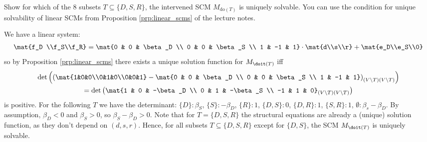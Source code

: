 \begin{enumerate}
	Show for which of the 8 subsets $T \subseteq \{D, S, R\}$, the intervened SCM $M_{\text{do}(T)}$ is uniquely solvable. You can use the condition for unique solvability of linear SCMs from Proposition \ref*{prp:linear_scms} of the lecture notes.
	\begin{ungradedsolution}
		We have a linear system:
		\begin{align*}
			\mat{f_D \\f_S\\f_R} = \mat{0 & 0 & \beta_D \\ 0 & 0 & \beta_S \\ 1 & -1 & 1}\cdot \mat{d\\s\\r}+\mat{e_D\\e_S\\0}
		\end{align*}
		so by Proposition \ref*{prp:linear_scms} there exists a unique solution function for $M_{\doit(T)}$ iff
		\begin{multline*}
			\det\left(\left(\mat{1&0&0\\0&1&0\\0&0&1} - \mat{0 & 0 & \beta_D \\ 0 & 0 & \beta_S \\ 1 & -1 & 1}\right)_{(V\setminus T)(V\setminus T)}\right) \\
			= \det\left(\mat{1 & 0 & -\beta_D \\ 0 & 1 & -\beta_S \\ -1 & 1 & 0}_{(V\setminus T)(V\setminus T)}\right)
		\end{multline*}
		is positive. For the following $T$ we have the determinant: $\{D\}: \beta_S$, $\{S\}:-\beta_D$, $\{R\}: 1$, $\{D, S\}: 0$, $\{D, R\}: 1$, $\{S, R\}: 1$, $\emptyset: \beta_s-\beta_D$. By assumption, $\beta_D < 0$ and $\beta_S> 0$, so $\beta_S-\beta_D > 0$. Note that for $T=\{D, S, R\}$ the structural equations are already a (unique) solution function, as they don't depend on $(d, s, r)$. Hence, for all subsets $T\subseteq\{D, S, R\}$ except for $\{D, S\}$, the SCM $M_{\doit(T)}$ is uniquely solvable.
	\end{ungradedsolution}

\end{enumerate}

